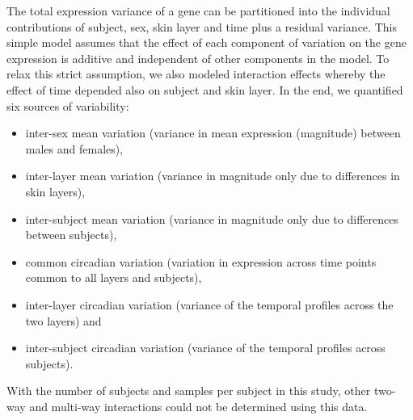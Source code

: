 The total expression variance of a gene can be partitioned into the individual contributions of subject, sex, skin layer and time plus a residual variance. This simple model assumes that the effect of each component of variation on the gene expression is additive and independent of other components in the model. To relax this strict assumption, we also modeled interaction effects whereby the effect of time depended also on subject and skin layer. In the end, we quantified six sources of variability: 
\begin{itemize}
	\item inter-sex mean variation (variance in mean expression (magnitude) between males and females),
	\item inter-layer mean variation (variance in magnitude only due to differences in skin layers),
	\item inter-subject mean variation (variance in magnitude only due to differences between subjects), 
	\item common circadian variation (variation in expression across time points common to all layers and subjects), 
	\item inter-layer circadian variation (variance of the temporal profiles across the two layers) and
	\item inter-subject circadian variation (variance of the temporal profiles across subjects).
\end{itemize}
With the number of subjects and samples per subject in this study, other two-way and multi-way interactions could not be determined using this data. 

